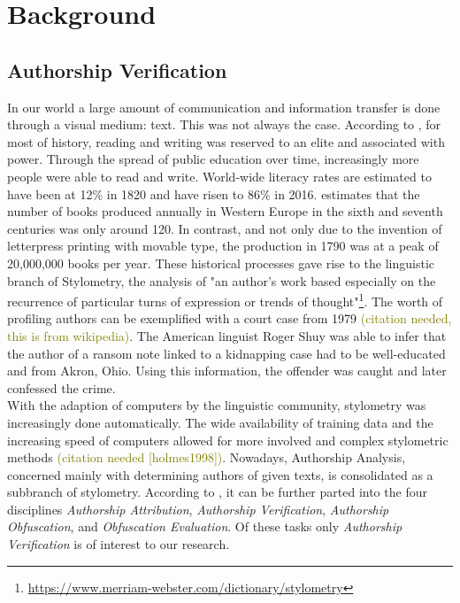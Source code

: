 \chapter{Background}\label{ch:background}
\section{Authorship Verification}\label{sec:authorship-verification}
In our world a large amount of communication and information transfer is done through a visual medium: text.
This was not always the case.
According to \cite{owidliteracy}, for most of history, reading and writing was reserved to an elite and associated with power.
Through the spread of public education over time, increasingly more people were able to read and write.
World-wide literacy rates are estimated to have been at 12\% in 1820 and have risen to 86\% in 2016.
\cite{buringh2009charting} estimates that the number of books produced annually in Western Europe in the sixth and seventh centuries was only around 120.
In contrast, and not only due to the invention of letterpress printing with movable type, the production in 1790 was at a peak of 20,000,000 books per year.
These historical processes gave rise to the linguistic branch of Stylometry, the analysis of "an author's work based especially on the recurrence of particular turns of expression or trends of thought"\footnote{\url{https://www.merriam-webster.com/dictionary/stylometry}}.
The worth of profiling authors can be exemplified with a court case from 1979 \textcolor{olive}{(citation needed, this is from wikipedia)}.
The American linguist Roger Shuy was able to infer that the author of a ransom note linked to a kidnapping case had to be well-educated and from Akron, Ohio.
Using this information, the offender was caught and later confessed the crime.\\
With the adaption of computers by the linguistic community, stylometry was increasingly done automatically.
The wide availability of training data and the increasing speed of computers allowed for more involved and complex stylometric methods \textcolor{olive}{(citation needed [holmes1998])}.
Nowadays, Authorship Analysis, concerned mainly with determining authors of given texts, is consolidated as a subbranch of stylometry.
According to \cite{bevendorff2020shared}, it can be further parted into the four disciplines \textit{Authorship Attribution}, \textit{Authorship Verification}, \textit{Authorship Obfuscation}, and \textit{Obfuscation Evaluation}.
Of these tasks only \textit{Authorship Verification} is of interest to our research.
